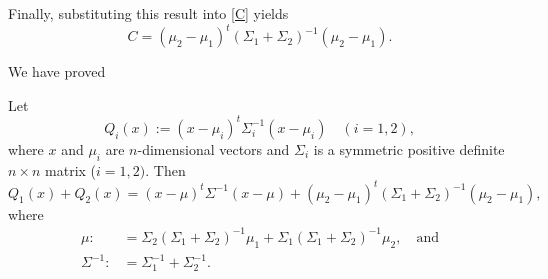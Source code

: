 \documentclass[12pt,leqno]{article}
\begin{document}
Finally, substituting this result into \eqref{C} yields
\begin{equation}\label{C:1}
  C = (\mu_2-\mu_1)^t(\Sigma_1+\Sigma_2)^{-1}(\mu_2-\mu_1).
\end{equation}

We have proved
\begin{Lem}\label{comp_sq:1}
  Let
  $$
  Q_i(x) := (x-\mu_i)^t\Sigma_i^{-1}(x-\mu_i)\quad(i = 1,2),
  $$
  where $x$ and $\mu_i$ are $n$-dimensional vectors and $\Sigma_i$ is a symmetric positive definite $n\times{n}$
  matrix ($i = 1,2)$. Then
  $$
  Q_1(x) + Q_2(x) = (x-\mu)^t\Sigma^{-1}(x-\mu) + (\mu_2-\mu_1)^t(\Sigma_1+\Sigma_2)^{-1}(\mu_2-\mu_1),
  $$
  where
  \begin{align*}
    \mu :&= \Sigma_2(\Sigma_1+\Sigma_2)^{-1}\mu_1+\Sigma_1(\Sigma_1+\Sigma_2)^{-1}\mu_2,\quad\text{and}\\
    \Sigma^{-1} :&= \Sigma_1^{-1} + \Sigma_2^{-1}.
  \end{align*}
\end{Lem}
\end{document}

